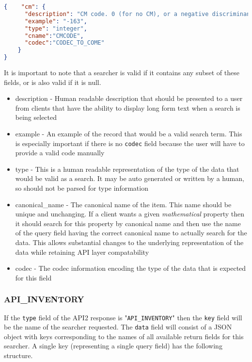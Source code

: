 \documentclass[11pt]{article}
\begin{document}
\begin{lstlisting}[language=json,firstnumber=1]
{    "cm": {
      "description": "CM code. 0 (for no CM), or a negative discriminant", 
      "example": "-163", 
      "type": "integer",
      "cname":"CMCODE",
      "codec":"CODEC_TO_COME"
    }
}
\end{lstlisting}
It is important to note that a searcher is valid if it contains any subset of these fields, or is also valid if it is null.
\begin{itemize}
\item description - Human readable description that should be presented to a user from clients that have the ability to display long form text when a search is being selected
\item example - An example of the record that would be a valid search term. This is especially important if there is no \texttt{codec} field because the user will have to provide a valid code manually
\item type - This is a human readable representation of the type of the data that would be valid as a search. It may be auto generated or written by a human, so should not be parsed for type information
\item canonical\_name - The canonical name of the item. This name should be unique and unchanging. If a client wants a given {\it mathematical} property then it should search for this property by canonical name and then use the name of the query field having the correct canonical name to actually search for the data. This allows substantial changes to the underlying representation of the data while retaining API layer compatability
\item codec - The codec information encoding the type of the data that is expected for this field
\end{itemize}

\subsubsection{API\_INVENTORY}
If the \texttt{type} field of the API2 response is "\texttt{API\_INVENTORY}" then the \texttt{key} field will be the name of the searcher requested. The \texttt{data} field will consist of a JSON object with keys corresponding to the names of all available return fields for this searcher. A single key (representing a single query field) has the following structure.
\end{document}
